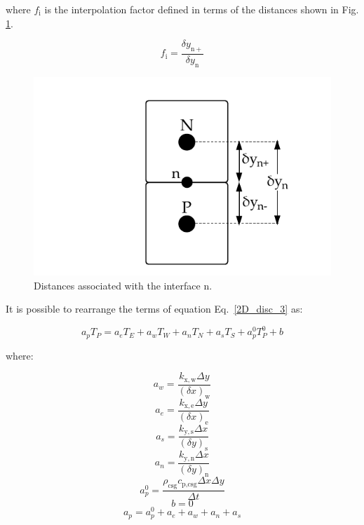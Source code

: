 \documentclass[review,preprint,12pt]{elsarticle}
\begin{document}
\noindent where $f_\textrm{i}$ is the interpolation factor defined in terms of the distances shown in Fig. \ref{fig:kn_evaluation}.

\begin{equation}
f_\textrm{i} =\frac{\delta y_\mathrm{n+}}{\delta y_\mathrm{n}}
\end{equation}

\begin{figure}[!ht]
  \centering
  \includegraphics[scale=0.8]{kn_evaluation.pdf}
  \caption{Distances associated with the interface $\mathrm{n}$.}
  \label{fig:kn_evaluation}
\end{figure}

It is possible to rearrange the terms of equation Eq.~\eqref{2D_disc_3} as:

\begin{equation}
a_pT_P = a_eT_E + a_wT_W + a_nT_N + a_sT_S +a_p^0T_P^0 +b
\label{2D-general}
\end{equation}

\noindent where:

\begin{equation}
a_w = \frac{k_\mathrm{x,w}\Delta y}{(\delta x)_\mathrm{w}}  \nonumber
\end{equation}
\begin{equation}
a_e = \frac{k_\mathrm{x,e}\Delta y}{(\delta x)_\mathrm{e}} \nonumber
\end{equation}
\begin{equation}
a_s = \frac{k_\mathrm{y,s}\Delta x}{(\delta y)_\mathrm{s}} \nonumber
\end{equation}
\begin{equation}
a_n = \frac{k_\mathrm{y,n}\Delta x}{(\delta y)_\mathrm{n}} \nonumber
\end{equation}
\begin{equation}
a_p^0 = \frac{\rho_\textrm{csg} c_\textrm{p,csg} \Delta x \Delta y}{\Delta t}  \nonumber
\end{equation}
\begin{equation}
b = 0 \nonumber
\end{equation}
\begin{equation}
a_p = a_p^0 + a_e + a_w + a_n + a_s \nonumber
\end{equation}
\end{document}
